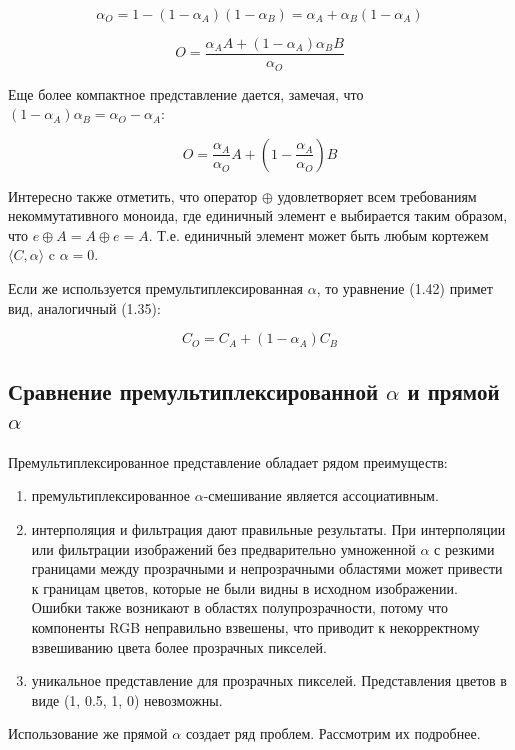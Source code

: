 \begin{equation}
\alpha_{O} = 1 - (1 - \alpha_{A})(1 - \alpha_{B}) =  \alpha_{A} + \alpha_{B}(1-\alpha_{A})
\end{equation}

\begin{equation}
O = \frac{\alpha_{A}A + (1-\alpha_{A})\alpha_{B}B}{\alpha_{O}}
\end{equation}

Еще более компактное представление дается, замечая, что $(1- \alpha_{A}) \alpha_{B} = \alpha_{O} - \alpha_{A}$:

\begin{equation}
O = \frac{\alpha_{A}}{\alpha_{O}}A + (1-\frac{\alpha_{A}}{\alpha_{O}})B
\end{equation}

Интересно также отметить, что оператор  $\oplus$ удовлетворяет всем требованиям некоммутативного моноида, где единичный элемент $е$ выбирается таким образом, что  $e\oplus A = A \oplus e = A$. Т.е. единичный элемент может быть любым кортежем $\langle C, \alpha \rangle$ c $\alpha = 0$.

Если же используется премультиплексированная $\alpha$, то уравнение (1.42) примет вид, аналогичный (1.35): 

\begin{equation}
C_{O} = C_{A} + (1-\alpha_{A})C_{B}
\end{equation}

\subsection{Сравнение премультиплексированной  $\alpha$ и прямой $\alpha$}
Премультиплексированное представление обладает рядом преимуществ: 
\begin{enumerate}
	\item премультиплексированное $\alpha$-смешивание является ассоциативным.
	\item интерполяция и фильтрация дают правильные результаты. При интерполяции или фильтрации изображений без предварительно умноженной $\alpha$ с резкими границами между прозрачными и непрозрачными областями  может привести к границам цветов, которые не были видны в исходном изображении. Ошибки также возникают в областях полупрозрачности, потому что компоненты RGB неправильно взвешены, что приводит к некорректному взвешиванию цвета более прозрачных пикселей.
	\item уникальное представление для прозрачных пикселей. Представления цветов в виде (1, 0.5, 1, 0) невозможны.
\end{enumerate}
Использование же прямой $\alpha$ создает ряд проблем. Рассмотрим их подробнее.
 
